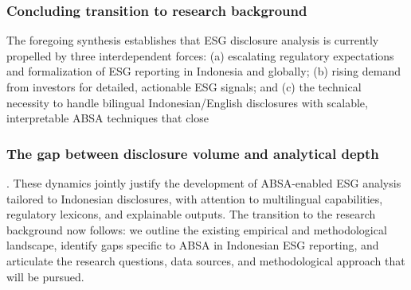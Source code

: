 \subsubsection{Concluding transition to research background}
The foregoing synthesis establishes that ESG disclosure analysis is currently propelled by three interdependent forces: (a) escalating regulatory expectations and formalization of ESG reporting in Indonesia and globally; (b) rising demand from investors for detailed, actionable ESG signals; and (c) the technical necessity to handle bilingual Indonesian/English disclosures with scalable, interpretable ABSA techniques that close 

\subsubsection{The gap between disclosure volume and analytical depth}. These dynamics jointly justify the development of ABSA-enabled ESG analysis tailored to Indonesian disclosures, with attention to multilingual capabilities, regulatory lexicons, and explainable outputs. The transition to the research background now follows: we outline the existing empirical and methodological landscape, identify gaps specific to ABSA in Indonesian ESG reporting, and articulate the research questions, data sources, and methodological approach that will be pursued.


